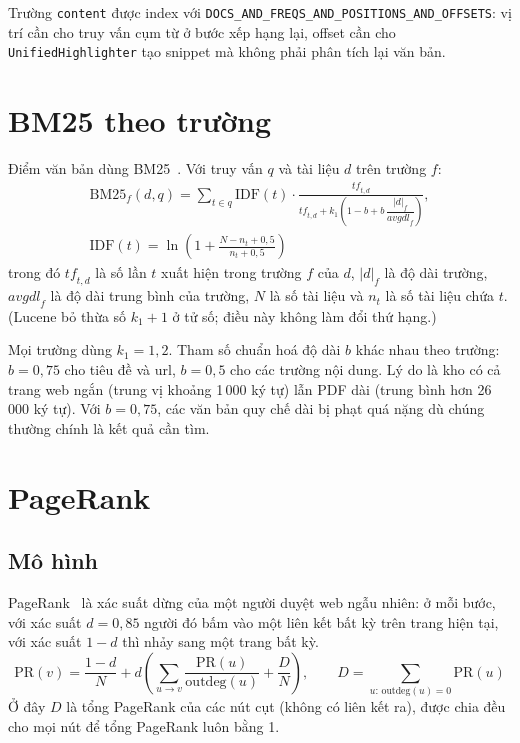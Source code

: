 \documentclass[12pt,a4paper]{report}
\begin{document}
Trường \texttt{content} được index với \texttt{DOCS\_\allowbreak{}AND\_\allowbreak{}FREQS\_\allowbreak{}AND\_\allowbreak{}POSITIONS\_\allowbreak{}AND\_\allowbreak{}OFFSETS}: vị trí cần cho truy vấn
cụm từ ở bước xếp hạng lại, offset cần cho \texttt{UnifiedHighlighter} tạo snippet mà không phải phân tích lại văn bản.

\section{BM25 theo trường}

Điểm văn bản dùng BM25~\cite{robertson2009}. Với truy vấn $q$ và tài liệu $d$ trên trường $f$:
\begin{gather}
\mathrm{BM25}_f(d, q) = \sum_{t \in q} \mathrm{IDF}(t)\cdot
  \frac{\mathit{tf}_{t,d}}{\mathit{tf}_{t,d} + k_1\left(1 - b + b\,\dfrac{|d|_f}{\mathit{avgdl}_f}\right)}, \\
\mathrm{IDF}(t) = \ln\!\left(1 + \frac{N - n_t + 0{,}5}{n_t + 0{,}5}\right)
\end{gather}
trong đó $\mathit{tf}_{t,d}$ là số lần $t$ xuất hiện trong trường $f$ của $d$, $|d|_f$ là độ dài trường,
$\mathit{avgdl}_f$ là độ dài trung bình của trường, $N$ là số tài liệu và $n_t$ là số tài liệu chứa $t$. (Lucene bỏ thừa
số $k_1 + 1$ ở tử số; điều này không làm đổi thứ hạng.)

Mọi trường dùng $k_1 = 1{,}2$. Tham số chuẩn hoá độ dài $b$ khác nhau theo trường: $b = 0{,}75$ cho tiêu đề và url,
$b = 0{,}5$ cho các trường nội dung. Lý do là kho có cả trang web ngắn (trung vị khoảng 1\,000 ký tự) lẫn PDF dài (trung
bình hơn 26\,000 ký tự). Với $b = 0{,}75$, các văn bản quy chế dài bị phạt quá nặng dù chúng thường chính là kết quả
cần tìm.

\section{PageRank}

\subsection{Mô hình}

PageRank~\cite{page1999} là xác suất dừng của một người duyệt web ngẫu nhiên: ở mỗi bước, với xác suất $d = 0{,}85$ người
đó bấm vào một liên kết bất kỳ trên trang hiện tại, với xác suất $1 - d$ thì nhảy sang một trang bất kỳ.
\begin{equation}
\mathrm{PR}(v) = \frac{1-d}{N} + d\left(\sum_{u \to v} \frac{\mathrm{PR}(u)}{\mathrm{outdeg}(u)} + \frac{D}{N}\right),
\qquad D = \sum_{u:\,\mathrm{outdeg}(u)=0} \mathrm{PR}(u)
\end{equation}
Ở đây $D$ là tổng PageRank của các nút cụt (không có liên kết ra), được chia đều cho mọi nút để tổng PageRank luôn bằng 1.
\end{document}

